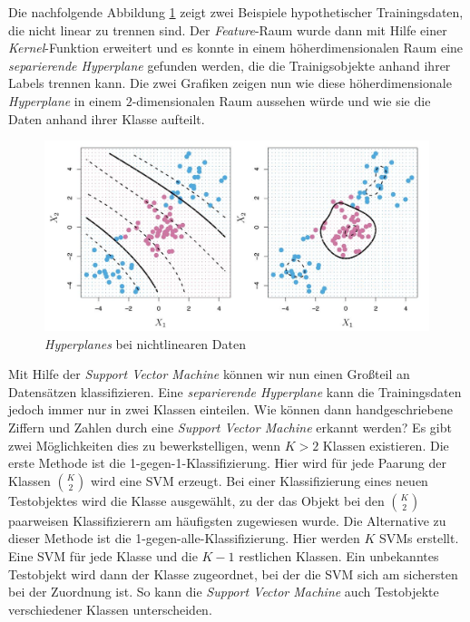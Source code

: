 Die nachfolgende Abbildung \ref{fig:non_linear_data} zeigt zwei Beispiele hypothetischer Trainingsdaten, die nicht linear zu trennen sind.
Der \textit{Feature}-Raum wurde dann mit Hilfe einer \textit{Kernel}-Funktion erweitert und es konnte in einem höherdimensionalen Raum eine
\textit{separierende Hyperplane} gefunden werden, die die Trainigsobjekte anhand ihrer Labels trennen kann. 
Die zwei Grafiken zeigen nun wie diese höherdimensionale \textit{Hyperplane} in einem $2$-dimensionalen Raum aussehen würde 
und wie sie die Daten anhand ihrer Klasse aufteilt.
\begin{figure}[H]
	\centering
	\includegraphics[width=\imgMed]{images/theory/non_linear_data.jpg}
	\caption{\textit{Hyperplanes} bei nichtlinearen Daten \cite[S. 353]{james_2013}} 
	\label{fig:non_linear_data}
\end{figure}
Mit Hilfe der \textit{Support Vector Machine} können wir nun einen Großteil an Datensätzen klassifizieren. 
Eine \textit{separierende Hyperplane} kann die Trainingsdaten jedoch immer nur in zwei Klassen einteilen. 
Wie können dann handgeschriebene Ziffern und Zahlen durch eine \textit{Support Vector Machine} erkannt werden?
Es gibt zwei Möglichkeiten dies zu bewerkstelligen, wenn $K > 2$ Klassen existieren.
Die erste Methode ist die 1-gegen-1-Klassifizierung. Hier wird für jede Paarung der Klassen $K \choose 2$
wird eine SVM erzeugt. Bei einer Klassifizierung eines neuen Testobjektes wird die Klasse ausgewählt, zu der das Objekt bei den
$K \choose 2$ paarweisen Klassifizierern am häufigsten zugewiesen wurde.
Die Alternative zu dieser Methode ist die 1-gegen-alle-Klassifizierung. Hier werden $K$ SVMs erstellt.
Eine SVM für jede Klasse und die $K-1$ restlichen Klassen. Ein unbekanntes Testobjekt wird dann der Klasse zugeordnet,
bei der die SVM sich am sichersten bei der Zuordnung ist. 
So kann die \textit{Support Vector Machine} auch Testobjekte verschiedener Klassen unterscheiden.\cite[S. 355f.]{james_2013}\cite[S.1567]{noble_2006}

